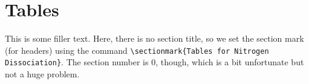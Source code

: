 \chapter{Tables}
\label{sec:Appendix_Tables}
This is some filler text. Here, there is no section title, so we set the section mark
(for headers) using the command \verb|\sectionmark{Tables for Nitrogen Dissociation}|.
The section number is 0, though, which is a bit unfortunate
   but not a huge problem.


\begin{landscape}



\end{landscape}
